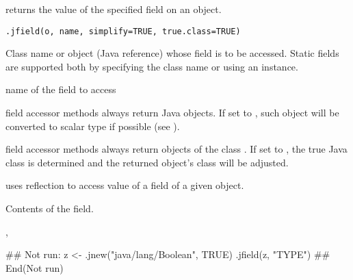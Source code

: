\begin{Description}\relax
{} returns the value of the specified field on an object.
\end{Description}
\begin{Usage}
\begin{verbatim}
.jfield(o, name, simplify=TRUE, true.class=TRUE)
\end{verbatim}
\end{Usage}
\begin{Arguments}
\begin{ldescription}
\item[\code{o}] Class name or object (Java reference) whose field is to be
accessed. Static fields are supported both by specifying the class
name or using an instance.
\item[\code{name}] name of the field to access
\item[\code{simplify}] field accessor methods always return Java objects. If
set to , such object will be converted to scalar type if
possible (see ).
\item[\code{true.class}] field accessor methods always return objects of the
class . If set to , the true Java
class is determined and the returned object's class will be
adjusted.
\end{ldescription}
\end{Arguments}
\begin{Details}\relax
{} uses reflection to access value of a field of a given
object.
\end{Details}
\begin{Value}
Contents of the field.
\end{Value}
\begin{SeeAlso}\relax
{}, 
\end{SeeAlso}
\begin{Examples}
\begin{ExampleCode}
## Not run: 
z <- .jnew("java/lang/Boolean", TRUE)
.jfield(z, "TYPE")
## End(Not run)
\end{ExampleCode}
\end{Examples}

